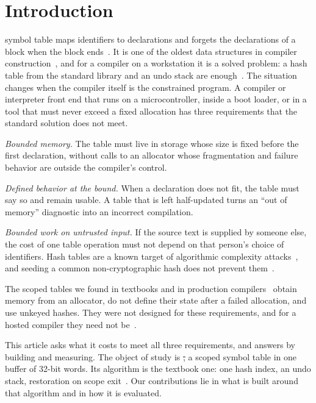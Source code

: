 \section{Introduction}
\label{sec:introduction}
 symbol table maps identifiers to declarations and forgets the declarations of a block when the block ends~\cite{aho2006}. It is one of the oldest data structures in compiler construction~\cite{graham1979}, and for a compiler on a workstation it is a solved problem: a hash table from the standard library and an undo stack are enough~\cite{appel1998}. The situation changes when the compiler itself is the constrained program. A compiler or interpreter front end that runs on a microcontroller, inside a boot loader, or in a tool that must never exceed a fixed allocation has three requirements that the standard solution does not meet.

\emph{Bounded memory.} The table must live in storage whose size is fixed before the first declaration, without calls to an allocator whose fragmentation and failure behavior are outside the compiler's control.

\emph{Defined behavior at the bound.} When a declaration does not fit, the table must say so and remain usable. A table that is left half-updated turns an ``out of memory'' diagnostic into an incorrect compilation.

\emph{Bounded work on untrusted input.} If the source text is supplied by someone else, the cost of one table operation must not depend on that person's choice of identifiers. Hash tables are a known target of algorithmic complexity attacks~\cite{crosby2003}, and seeding a common non-cryptographic hash does not prevent them~\cite{aumasson2012}.

The scoped tables we found in textbooks and in production compilers~\cite{appel1998,llvmsht,tcc} obtain memory from an allocator, do not define their state after a failed allocation, and use unkeyed hashes. They were not designed for these requirements, and for a hosted compiler they need not be~\cite{rustchash}.

This article asks what it costs to meet all three requirements, and answers by building and measuring. The object of study is \st, a scoped symbol table in one buffer of 32-bit words. Its algorithm is the textbook one: one hash index, an undo stack, restoration on scope exit~\cite{appel1998}. Our contributions lie in what is built around that algorithm and in how it is evaluated.

